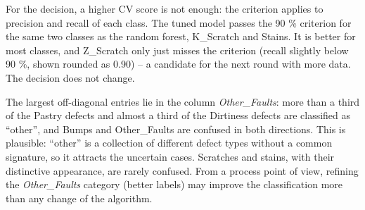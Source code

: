 \documentclass[
  letterpaper,
  DIV=11,
  numbers=noendperiod]{scrreprt}
\begin{document}
\begin{tcolorbox}
For the decision, a higher CV score is not enough: the criterion applies
to precision and recall of each class. The tuned model passes the 90 \%
criterion for the same two classes as the random forest, K\_Scratch and
Stains. It is better for most classes, and Z\_Scratch only just misses
the criterion (recall slightly below 90 \%, shown rounded as 0.90) -- a
candidate for the next round with more data. The decision does not
change.

\end{tcolorbox}

\begin{tcolorbox}[enhanced jigsaw, left=2mm, title=\textcolor{quarto-callout-caution-color}{\faFire}\hspace{0.5em}{Solution to Exercise 2}, opacityback=0, breakable, rightrule=.15mm, arc=.35mm, toptitle=1mm, colbacktitle=quarto-callout-caution-color!10!white, opacitybacktitle=0.6, coltitle=black, colframe=quarto-callout-caution-color-frame, bottomrule=.15mm, leftrule=.75mm, bottomtitle=1mm, titlerule=0mm, toprule=.15mm, colback=white]

The largest off-diagonal entries lie in the column \emph{Other\_Faults}:
more than a third of the Pastry defects and almost a third of the
Dirtiness defects are classified as ``other'', and Bumps and
Other\_Faults are confused in both directions. This is plausible:
``other'' is a collection of different defect types without a common
signature, so it attracts the uncertain cases. Scratches and stains,
with their distinctive appearance, are rarely confused. From a process
point of view, refining the \emph{Other\_Faults} category (better
labels) may improve the classification more than any change of the
algorithm.

\end{tcolorbox}
\end{document}
